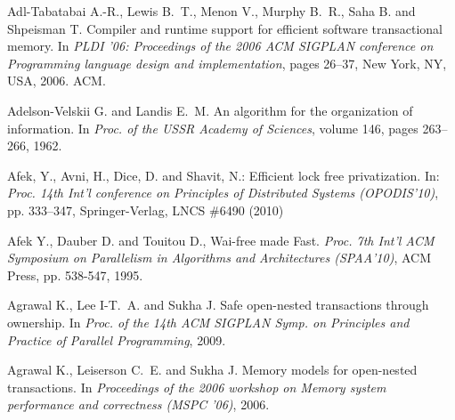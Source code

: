 \begin{thebibliography}{99}
\small{




Adl-Tabatabai A.-R., Lewis B.~T., Menon V., Murphy B.~R., 
  Saha B. and Shpeisman T.
\newblock Compiler and runtime support for efficient software transactional
  memory.
\newblock In {\em PLDI '06: Proceedings of the 2006 ACM SIGPLAN conference on
  Programming language design and implementation}, pages 26--37, New York, NY,
  USA, 2006. ACM.



Adelson-Velskii G. and Landis E.~M.
\newblock An algorithm for the organization of information.
\newblock In {\em Proc. of the USSR Academy of Sciences}, volume 146, pages
  263--266, 1962.






 Afek, Y.,  Avni, H.,   Dice, D. and  Shavit, N.: Efficient lock free privatization. 
In: {\it Proc.  14th Int'l conference on Principles of Distributed Systems 
(OPODIS'10)}, pp. 333--347, Springer-Verlag,  LNCS \#6490 (2010) 



Afek Y., Dauber D. and Touitou D.,
Wai-free made Fast. 
{\it Proc. 7th  Int'l  ACM Symposium on Parallelism in Algorithms 
and Architectures   (SPAA'10)},  ACM Press, pp. 538-547,  1995. 






Agrawal K., Lee I-T.~A. and Sukha J.
\newblock Safe open-nested transactions through ownership.
\newblock In {\em Proc. of the 14th ACM SIGPLAN Symp. on Principles and
  Practice of Parallel Programming}, 2009.

Agrawal K., Leiserson C.~E. and Sukha J.
\newblock Memory models for open-nested transactions.
\newblock In {\em Proceedings of the 2006 workshop on Memory system
  performance and correctness (MSPC '06)}, 2006.


}
\end{thebibliography}
